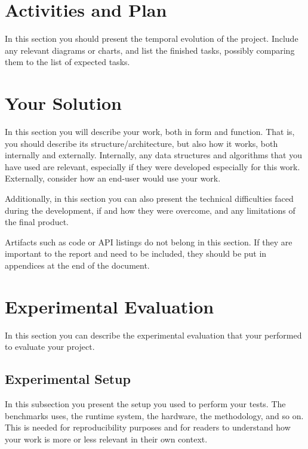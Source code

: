 \documentclass{article}
\begin{document}
\section{Activities and Plan}
\label{sec:activities}
In this section you should present the temporal evolution of the project. Include any relevant diagrams or charts, and list the finished tasks, possibly comparing them to the list of expected tasks.

\section{Your Solution}
\label{sec:solution}
In this section you will describe your work, both in form and function. That is, you should describe its structure/architecture, but also how it works, both internally and externally. Internally, any data structures and algorithms that you have used are relevant, especially if they were developed especially for this work. Externally, consider how an end-user would use your work.

Additionally, in this section you can also present the technical difficulties faced during the development, if and how they were overcome, and any limitations of the final product.

Artifacts such as code or API listings do not belong in this section. If they are important to the report and need to be included, they should be put in appendices at the end of the document.

\section{Experimental Evaluation}
\label{sec:evaluation}
In this section you can describe the experimental evaluation that your performed to evaluate your project.

\subsection{Experimental Setup}
In this subsection you present the setup you used to perform your tests. The benchmarks uses, the runtime system, the hardware, the methodology, and so on. This is needed for reproducibility purposes and for readers to understand how your work is more or less relevant in their own context.
\end{document}
